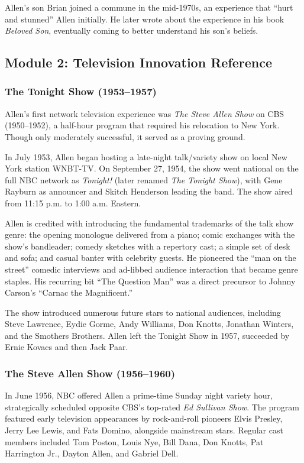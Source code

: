 \documentclass[11pt,letterpaper]{article}
\begin{document}
Allen's son Brian joined a commune in the mid-1970s, an experience that ``hurt and stunned'' Allen initially. He later wrote about the experience in his book \textit{Beloved Son}, eventually coming to better understand his son's beliefs.

\subsection{Module 2: Television Innovation Reference}

\subsubsection{The Tonight Show (1953--1957)}

Allen's first network television experience was \textit{The Steve Allen Show} on CBS (1950--1952), a half-hour program that required his relocation to New York. Though only moderately successful, it served as a proving ground.

In July 1953, Allen began hosting a late-night talk/variety show on local New York station WNBT-TV. On September 27, 1954, the show went national on the full NBC network as \textit{Tonight!} (later renamed \textit{The Tonight Show}), with Gene Rayburn as announcer and Skitch Henderson leading the band. The show aired from 11:15 p.m. to 1:00 a.m. Eastern.

Allen is credited with introducing the fundamental trademarks of the talk show genre: the opening monologue delivered from a piano; comic exchanges with the show's bandleader; comedy sketches with a repertory cast; a simple set of desk and sofa; and casual banter with celebrity guests. He pioneered the ``man on the street'' comedic interviews and ad-libbed audience interaction that became genre staples. His recurring bit ``The Question Man'' was a direct precursor to Johnny Carson's ``Carnac the Magnificent.''

The show introduced numerous future stars to national audiences, including Steve Lawrence, Eydie Gorme, Andy Williams, Don Knotts, Jonathan Winters, and the Smothers Brothers. Allen left the Tonight Show in 1957, succeeded by Ernie Kovacs and then Jack Paar.

\subsubsection{The Steve Allen Show (1956--1960)}

In June 1956, NBC offered Allen a prime-time Sunday night variety hour, strategically scheduled opposite CBS's top-rated \textit{Ed Sullivan Show}. The program featured early television appearances by rock-and-roll pioneers Elvis Presley, Jerry Lee Lewis, and Fats Domino, alongside mainstream stars. Regular cast members included Tom Poston, Louis Nye, Bill Dana, Don Knotts, Pat Harrington Jr., Dayton Allen, and Gabriel Dell.
\end{document}
